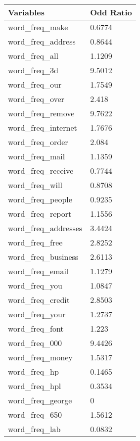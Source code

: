 \begin{tabular}{|l|l|}
\hline
Variables                    & Odd Ratio \\
\hline
word\_freq\_make                 & 0.6774 \\
word\_freq\_address              & 0.8644 \\
word\_freq\_all                  & 1.1209 \\
word\_freq\_3d                   & 9.5012 \\
word\_freq\_our                  & 1.7549 \\
word\_freq\_over                 &  2.418 \\
word\_freq\_remove               & 9.7622 \\
word\_freq\_internet             & 1.7676 \\
word\_freq\_order                &  2.084 \\
word\_freq\_mail                 & 1.1359 \\
word\_freq\_receive              & 0.7744 \\
word\_freq\_will                 & 0.8708 \\
word\_freq\_people               & 0.9235 \\
word\_freq\_report               & 1.1556 \\
word\_freq\_addresses            & 3.4424 \\
word\_freq\_free                 & 2.8252 \\
word\_freq\_business             & 2.6113 \\
word\_freq\_email                & 1.1279 \\
word\_freq\_you                  & 1.0847 \\
word\_freq\_credit               & 2.8503 \\
word\_freq\_your                 & 1.2737 \\
word\_freq\_font                 &  1.223 \\
word\_freq\_000                  & 9.4426 \\
word\_freq\_money                & 1.5317 \\
word\_freq\_hp                   & 0.1465 \\
word\_freq\_hpl                  & 0.3534 \\
word\_freq\_george               &      0 \\
word\_freq\_650                  & 1.5612 \\
word\_freq\_lab                  & 0.0832 \\

\end{tabular}
